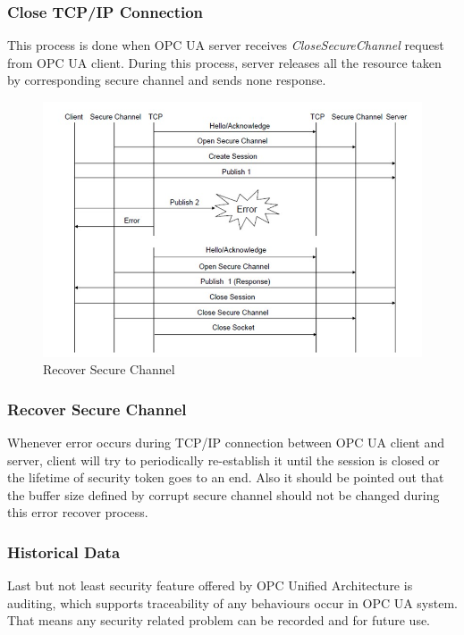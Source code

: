 \documentclass[]{llncs}
\begin{document}
\subsubsection{Close TCP/IP Connection}
This process is done when OPC UA server receives \emph{CloseSecureChannel} request from OPC UA client. During this process, server releases all the resource taken by corresponding secure channel and sends none response.
\begin{figure}[!htbp]
	\centering
	\includegraphics[width=1\textwidth]{tcp_3.jpg}
		\caption[ ]{Recover Secure Channel\cite{O6}}
	\label{fig:tcp_3}
\end{figure}

\subsubsection{Recover Secure Channel}


Whenever error occurs during TCP/IP connection between OPC UA client and server, client will try to periodically re-establish it until the session is closed or the lifetime of security token goes to an end. Also it should be pointed out that the buffer size defined by corrupt secure channel should not be changed during this error recover process.

\subsubsection{Historical Data}
Last but not least security feature offered by OPC Unified Architecture is auditing, which supports traceability of any behaviours occur in OPC UA system. That means any security related problem can be recorded and for future use.
\end{document}
